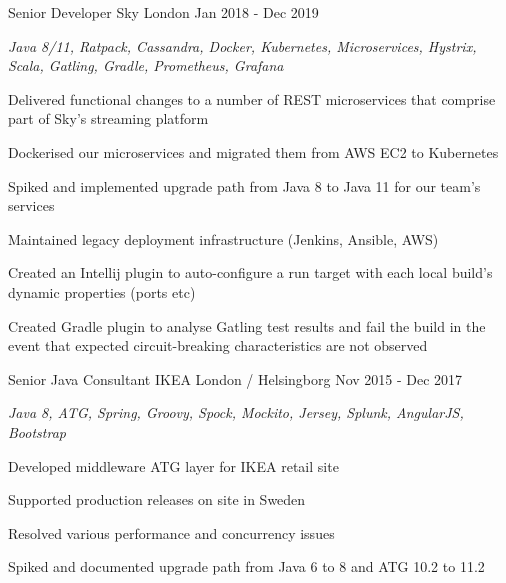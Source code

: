 \begin{cventries}
  \cventry
    {Senior Developer} %
    {Sky} %
    {London} %
    {Jan 2018 - Dec 2019} %
    {
      \begin{cvitems} %
        \item {\itshape{Java 8/11, Ratpack, Cassandra, Docker, Kubernetes, Microservices, Hystrix, Scala, Gatling, Gradle, Prometheus, Grafana}}
        \item {Delivered functional changes to a number of REST microservices that comprise part of Sky’s streaming platform}
        \item {Dockerised our microservices and migrated them from AWS EC2 to Kubernetes}
        \item {Spiked and implemented upgrade path from Java 8 to Java 11 for our team's services}
        \item {Maintained legacy deployment infrastructure (Jenkins, Ansible, AWS)}
        \item {Created an Intellij plugin to auto-configure a run target with each local build's dynamic properties (ports etc)}
        \item {Created Gradle plugin to analyse Gatling test results and fail the build in the event that expected circuit-breaking characteristics are not observed}
      \end{cvitems}
    }

  \cventry
    {Senior Java Consultant} %
    {IKEA} %
    {London / Helsingborg} %
    {Nov 2015 - Dec 2017} %
    {
      \begin{cvitems} %
        \item {\itshape{Java 8, ATG, Spring, Groovy, Spock, Mockito, Jersey, Splunk, AngularJS, Bootstrap}}
        \item {Developed middleware ATG layer for IKEA retail site}
        \item {Supported production releases on site in Sweden}
        \item {Resolved various performance and concurrency issues}
        \item {Spiked and documented upgrade path from Java 6 to 8 and ATG 10.2 to 11.2}
      \end{cvitems}
    }


\end{cventries}
